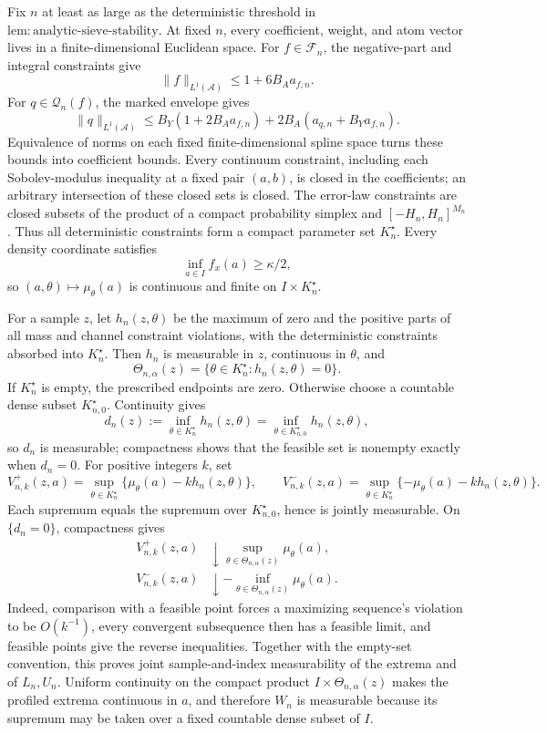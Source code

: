 Fix \(n\) at least as large as the deterministic threshold in \(\mathrm{lem{:}analytic\text{-}sieve\text{-}stability}\). At fixed \(n\), every coefficient, weight, and atom vector lives in a finite-dimensional Euclidean space. For \(f\in\mathscr F_n\), the negative-part and integral constraints give
\[
 \|f\|_{L^1(\mathcal A)}\le1+6B_Aa_{f,n}.
\]
For \(q\in\mathscr Q_n(f)\), the marked envelope gives
\[
 \|q\|_{L^1(\mathcal A)}
 \le B_Y(1+2B_Aa_{f,n})+2B_A(a_{q,n}+B_Ya_{f,n}).
\]
Equivalence of norms on each fixed finite-dimensional spline space turns these bounds into coefficient bounds. Every continuum constraint, including each Sobolev-modulus inequality at a fixed pair \((a,b)\), is closed in the coefficients; an arbitrary intersection of these closed sets is closed. The error-law constraints are closed subsets of the product of a compact probability simplex and \([-H_n,H_n]^{M_n}\). Thus all deterministic constraints form a compact parameter set \(K_n^\star\). Every density coordinate satisfies
\[
 \inf_{a\in I}f_x(a)\ge\kappa/2,
\]
so \((a,\theta)\mapsto\mu_\theta(a)\) is continuous and finite on \(I\times K_n^\star\).

For a sample \(z\), let \(h_n(z,\theta)\) be the maximum of zero and the positive parts of all mass and channel constraint violations, with the deterministic constraints absorbed into \(K_n^\star\). Then \(h_n\) is measurable in \(z\), continuous in \(\theta\), and
\[
 \Theta_{n,\alpha}(z)=\{\theta\in K_n^\star:h_n(z,\theta)=0\}.
\]
If \(K_n^\star\) is empty, the prescribed endpoints are zero. Otherwise choose a countable dense subset \(K_{n,0}^\star\). Continuity gives
\[
 d_n(z):=\inf_{\theta\in K_n^\star}h_n(z,\theta)
 =\inf_{\theta\in K_{n,0}^\star}h_n(z,\theta),
\]
so \(d_n\) is measurable; compactness shows that the feasible set is nonempty exactly when \(d_n=0\). For positive integers \(k\), set
\[
 V_{n,k}^+(z,a)=\sup_{\theta\in K_n^\star}
 \{\mu_\theta(a)-kh_n(z,\theta)\},
 \qquad
 V_{n,k}^-(z,a)=\sup_{\theta\in K_n^\star}
 \{-\mu_\theta(a)-kh_n(z,\theta)\}.
\]
Each supremum equals the supremum over \(K_{n,0}^\star\), hence is jointly measurable. On \(\{d_n=0\}\), compactness gives
\[
 \begin{aligned}
 V_{n,k}^+(z,a)&\downarrow
 \sup_{\theta\in\Theta_{n,\alpha}(z)}\mu_\theta(a),\\
 V_{n,k}^-(z,a)&\downarrow
 -\inf_{\theta\in\Theta_{n,\alpha}(z)}\mu_\theta(a).
 \end{aligned}
\]
Indeed, comparison with a feasible point forces a maximizing sequence's violation to be \(O(k^{-1})\), every convergent subsequence then has a feasible limit, and feasible points give the reverse inequalities. Together with the empty-set convention, this proves joint sample-and-index measurability of the extrema and of \(L_n,U_n\). Uniform continuity on the compact product \(I\times\Theta_{n,\alpha}(z)\) makes the profiled extrema continuous in \(a\), and therefore \(W_n\) is measurable because its supremum may be taken over a fixed countable dense subset of \(I\).


